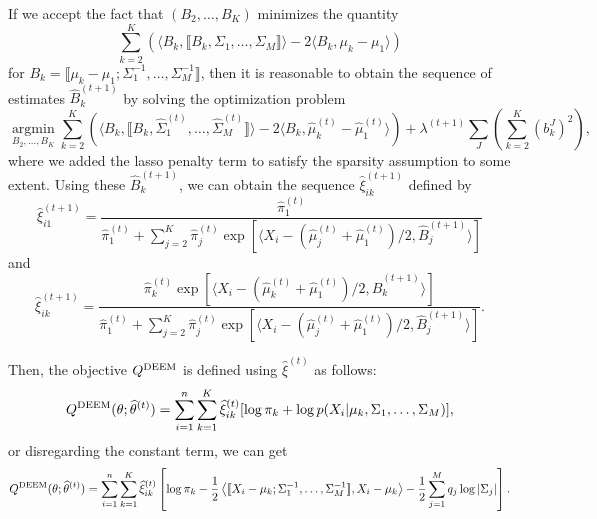 \documentclass[11pt]{article}
\newcommand{\br}[1]{\llbracket #1 \rrbracket}
\newcommand{\amin}{\operatorname*{argmin}}
\newcommand{\wh}{\widehat}
\begin{document}
If we accept the fact that $(B_2,\dots, B_K)$ minimizes the quantity
\begin{equation*}
  \sum_{k=2}^K  \left( \langle B_k , \br{B_k, \Sigma_1 , \dots , \Sigma_M} \rangle - 2 \langle B_k , \mu_k - \mu_1 \rangle \right)
\end{equation*}
for $B_k= \br{\mu_k - \mu_1 ; \Sigma_1^{-1} , \dots , \Sigma_M^{-1}}$, then it is reasonable to obtain the sequence of estimates $\wh B_k^{(t+1)}$ by solving the optimization problem
\begin{equation}\label{eq-B}
  \amin_{B_2,\dots, B_K}\sum_{k=2}^K  \left( \langle B_k , \br{B_k, \wh\Sigma_1^{(t)} , \dots , \wh \Sigma_M^{(t)}} \rangle - 2 \langle B_k , \wh \mu_k ^{(t)}- \wh \mu_1^{(t)} \rangle \right) + \lambda^{(t+1)}\sum_J \left( \sum_{k=2}^K (b_k^J)^2 \right),
\end{equation}
where we added the lasso penalty term to satisfy the sparsity assumption to some extent.
Using these $\wh B_k^{(t+1)}$, we can obtain the sequence $\wh\xi^{(t+1)}_{ik}$ defined by
\begin{equation}\label{eq-xi}
  \wh\xi_{i1}^{(t+1)} = \frac{\wh\pi_1^{(t)}}{\wh\pi_1^{(t)} + \sum_{j=2}^K \wh \pi_j ^{(t)}  \exp\left[ \langle X_i - (\wh \mu_j^{(t)} +\wh \mu_1^{(t)} )/2 , \wh B_j^{(t+1)}  \rangle \right]}
\end{equation}
and
\begin{equation*}
   \wh\xi_{ik}^{(t+1)} = \frac{\wh\pi_k^{(t)}\exp\left[ \langle X_i - (\wh \mu_k^{(t)} +\wh \mu_1^{(t)} )/2 , \wh B_k^{(t+1)}  \rangle \right]}{\wh\pi_1^{(t)} + \sum_{j=2}^K \wh \pi_j ^{(t)}  \exp\left[ \langle X_i - (\wh \mu_j^{(t)} +\wh \mu_1^{(t)} )/2 , \wh B_j^{(t+1)}  \rangle \right]}.
\end{equation*}





Then, the objective $Q^{\textup{DEEM}}$ is defined using $\wh\xi^{(t)}$ as follows:
\begin{equation*}
  Q^{\textup{DEEM}}(\theta; \wh\theta^{(t)}) = \sum_{i=1}^n \sum_{k=1}^K \wh \xi^{(t)}_{ik}[\log \pi_k +\log p(X_i| \mu_k , \Sigma_1, \dots , \Sigma_M)],
  \end{equation*}
or disregarding the constant term, we can get
\begin{equation*}
  	Q^{\textup{DEEM}}(\theta; \wh\theta^{(t)}) = \sum_{i=1}^n \sum_{k=1}^K \wh \xi^{(t)}_{ik}\left[\log \pi_k -\frac{1}{2} \left\langle \br{X_i-\mu_k; \Sigma_1^{-1}, \dots, \Sigma_M^{-1}}, X_i-\mu_k \right\rangle - \frac{1}{2}\sum_{j=1}^M q_j\log|\Sigma_j| \right].
\end{equation*}
\end{document}
